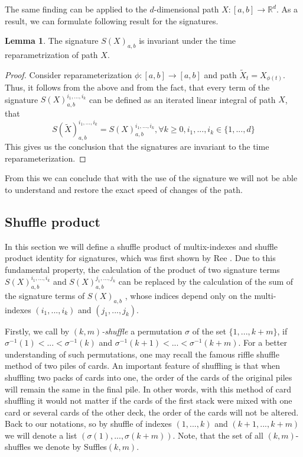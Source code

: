 \documentclass[12pt,a4paper]{report}
\theoremstyle{definition}
\newtheorem{lemma}{Lemma}
\begin{document}
The same finding can be applied to the $d$-dimensional path $X :[a, b]\rightarrow\mathbb{R}^d$. As a result, we can formulate following result for the signatures.
\begin{lemma}
The signature $S(X)_{a,b}$ is invariant under the time reparametrization of path $X$.
\end{lemma}
\begin{proof}
	 Consider reparameterization $\phi:[a,b]\rightarrow[a,b]$ and path $\tilde{X}_t=X_{\phi(t)}$. Thus, it follows from the above and from the fact, that every term of the signature $S(X)_{a,b}^{i_1,...,i_k}$ can be defined as an iterated linear integral of path $X$, that
	\begin{equation}	
		S(\tilde{X})_{a,b}^{i_1,...,i_k}=S(X)_{a,b}^{i_1,...,i_k}, \forall k\geq 0, i_1,...,i_k \in \{1,...,d\}
	\end{equation}	
	This gives us the conclusion that the signatures are invariant to the time reparameterization.
\end{proof}

From this we can conclude that with the use of the signature we will not be able to understand and restore the exact speed of changes of the path.


\subsection{Shuffle product}

In this section we will define a shuffle product of multix-indexes and shuffle product identity for signatures, which was first shown by Ree \parencite{ree1958lie}. Due to this fundamental property, the calculation of the product of two signature terms $S(X)_{a,b}^{i_1,...,i_k}$ and $S(X)_{a,b}^{j_1,...,j_k}$ can be replaced by the calculation of the sum of the signature terms of $S(X)_{a,b}$ , whose indices depend only on the multi-indexes  $(i_1,..., i_k)$ and $ (j_1,..., j_k)$. 




 Firstly, we call by\textit{ $(k,m)$-shuffle} a permutation $\sigma$ of the set $\{1,..., k+m\}$, if $\sigma^{-1}(1)<...< \sigma^{-1}(k)$ and $\sigma^{-1}(k+1)<...<\sigma^{-1}(k+m)$. For a better understanding of such permutations, one may recall the famous riffle shuffle method of two piles of cards. An important feature of shuffling is that when shuffling two packs of cards into one, the order of the cards of the original piles will remain the same in the final pile. In other words, with this method of card shuffling it would not matter if the cards of the first stack were mixed with one card or several cards of the other deck, the order of the cards will not be altered. Back to our notations, so by shuffle of indexes $(1,...,k)$ and $(k+1,...,k+m)$ we will denote a list $(\sigma(1),...,\sigma(k+m))$. Note, that the set of all $(k,m)$-shuffles we denote by Suffles$(k,m)$.
\end{document}
